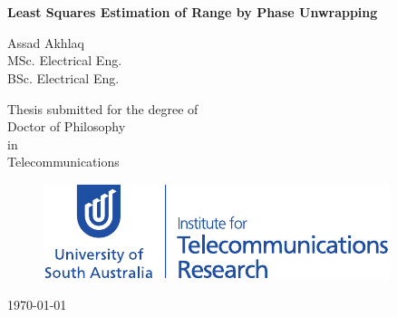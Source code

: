 \newcommand{\doctitle}{Least Squares Estimation  of Range by Phase Unwrapping }

\begin{center}


  \huge{~\\~\\}

  \huge{\bf\doctitle}\\

  \vspace{15mm}

  {\huge{Assad Akhlaq}}\\
  {\Large MSc. Electrical Eng.} \\
{\Large BSc. Electrical Eng.}

  \vspace{20mm}
  \Large{Thesis submitted for the degree of\\
    Doctor of Philosophy\\ in \\Telecommunications}
\vspace{20 mm}
  \Large{~\\}

  \begin{figure} [h]
    \centering
      \includegraphics[width=0.80\columnwidth]{InstTelecomRsch_01.pdf}
  \end{figure}


  \vspace{20mm}

  \Large{\today}  %

\end{center}

